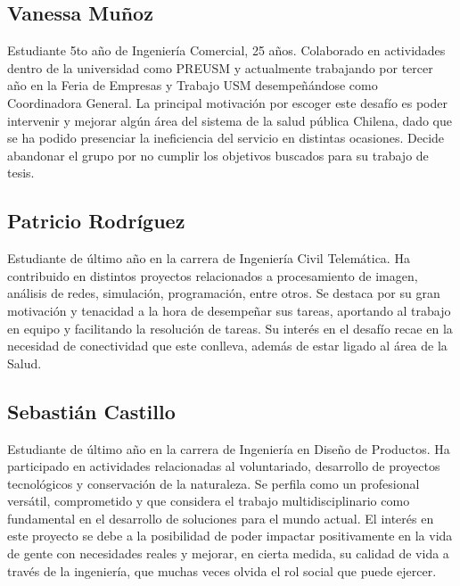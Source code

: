 \subsection{Vanessa Muñoz}
Estudiante 5to año de Ingeniería Comercial, 25 años. Colaborado en actividades dentro de la universidad como PREUSM y actualmente trabajando por tercer año en la Feria de Empresas y Trabajo USM desempeñándose como Coordinadora General. La principal motivación por escoger este desafío es poder intervenir y mejorar algún área del sistema de la salud pública Chilena, dado que se ha podido presenciar la ineficiencia del servicio en distintas ocasiones. 
Decide abandonar el grupo por no cumplir los objetivos buscados para su trabajo de tesis.

\newpage
\subsection{Patricio Rodríguez}
Estudiante de último año en la carrera de Ingeniería Civil Telemática. Ha contribuido en distintos proyectos relacionados a procesamiento de imagen, análisis de redes, simulación, programación, entre otros. Se destaca por su gran motivación y tenacidad a la hora de desempeñar sus tareas, aportando al trabajo en equipo y facilitando la resolución de tareas. Su interés en el desafío recae en la necesidad de conectividad que este conlleva, además de estar ligado al área de la Salud.

\subsection{Sebastián Castillo}
Estudiante de último año en la carrera de Ingeniería en Diseño de Productos. Ha participado en actividades relacionadas al voluntariado, desarrollo de proyectos tecnológicos y conservación de la naturaleza. Se perfila como un profesional versátil, comprometido y que considera el trabajo multidisciplinario como fundamental en el desarrollo de soluciones para el mundo actual. El interés en este proyecto se debe a la posibilidad de poder impactar positivamente en la vida de gente con necesidades reales y mejorar, en cierta medida, su calidad de vida a través de la ingeniería, que muchas veces olvida el rol social que puede ejercer.

\newpage
